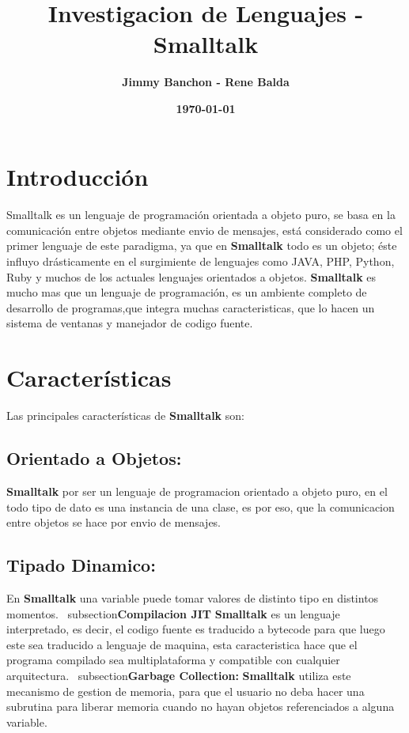 \documentclass[11pt]{article}
\title{\textbf{Investigacion de Lenguajes - Smalltalk}}
\author{\textbf{Jimmy Banchon - Rene Balda}}
\date{\textbf{\today}}
\begin{document}
\maketitle
\section{\textbf{Introducción}} 
\paragraph{} \noindent
Smalltalk es un lenguaje de programación orientada a objeto puro, se basa en la comunicación entre objetos mediante envio de mensajes, está considerado como el primer lenguaje de este paradigma, ya que  en \textbf{Smalltalk} todo es un objeto; éste influyo drásticamente en el surgimiente de lenguajes como JAVA, PHP, Python, Ruby y muchos de los actuales lenguajes orientados a objetos.
 \textbf{Smalltalk} es mucho mas que un lenguaje de programación, es un ambiente completo de desarrollo de programas,que integra muchas caracteristicas, que lo hacen un sistema de ventanas y manejador de codigo fuente.
\section{\textbf{Características}}
Las principales características de  \textbf{Smalltalk} son:
\subsection{\textbf{Orientado a Objetos:}}
\textbf{Smalltalk} por ser un lenguaje de programacion orientado a objeto puro, en el todo tipo de dato es una instancia de una clase, es por eso, que la comunicacion entre objetos se hace por envio de mensajes.
\subsection{\textbf{Tipado Dinamico:}}
En \textbf{Smalltalk} una variable puede tomar valores de distinto tipo en distintos momentos.
\ subsection{\textbf{Compilacion JIT}}
\textbf{Smalltalk} es un lenguaje interpretado, es decir, el codigo fuente es traducido a bytecode para que luego este sea traducido a lenguaje de maquina, esta caracteristica hace que el programa compilado sea multiplataforma y compatible con cualquier arquitectura.
\ subsection{\textbf{Garbage Collection:}}
\textbf{Smalltalk} utiliza este mecanismo de gestion de memoria, para que el usuario no deba hacer una subrutina para liberar memoria cuando no hayan objetos referenciados a alguna variable.
\end{document}
